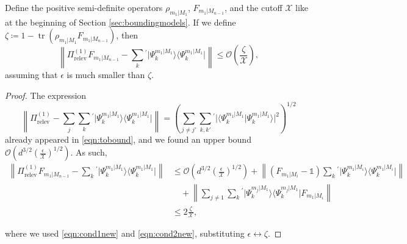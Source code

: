 \begin{lemma}
\label{lem:approxproj}
Define the positive semi-definite operators $\rho_{m_1\vert M_1}$, $F_{m_1\vert M_{n-1}}$, and the cutoff $\mathcal{X}$ like at the beginning of Section \ref{sec:boundingmodels}. If we define $ \zeta\coloneqq 1- \operatorname{tr}(\rho_{m_1\vert M_1}F_{m_1 \vert M_{n-1}})$, then \[\left\|\Pi_{\text{relev}}^{(1)}F_{m_1\vert M_{n-1}}-\sum_k{}^{'}\vert \Psi_k^{m_1\vert M_1} \rangle \langle \Psi_k^{m_1\vert M_1} \vert \right\|\leq \mathcal{O}\left(\frac{\zeta}{\mathcal{X}}\right),\]
assuming that $\epsilon$ is much smaller than $\zeta$.
\end{lemma}
\begin{proof}
The expression \[\left\| \Pi_{\text{relev}}^{(1)}-\sum_j \sum_k{}^{'}\vert \Psi_k^{m_1\vert M_1}\rangle \langle \Psi_k^{m_1\vert M_1} \vert \right\| =  \left(\sum_{j\neq j'}\sum_{k,k'}{}^{'}\vert \langle \Psi_k^{m_1\vert M_1} \vert  \Psi_k^{m_1\vert M_1} \rangle \vert ^2 \right)^{1/2}\] already appeared in \ref{eqn:tobound}, and we found an upper bound $\mathcal{O}\left(d^{3/2}\left(\frac{\epsilon}{\mathcal{X}}\right)^{1/2}\right)$. As such,
\[\begin{split}
\left\|\Pi_{\text{relev}}^{(1)}F_{m_1\vert M_{n-1}}-\sum_k{}^{'}\vert \Psi_k^{m_1\vert M_1} \rangle \langle \Psi_k^{m_1\vert M_1} \vert \right\| & \leq \mathcal{O}\left(d^{3/2}\left(\frac{\epsilon}{\mathcal{X}}\right)^{1/2}\right) + \left\| \left(F_{m_1\vert M_i}-\mathbb{1}\right)\sum_k{}^{'}\vert \Psi_k^{m_1\vert M_i}\rangle \langle \Psi_k^{m_1\vert M_i} \vert \right\| \\[0.5em]
&\hspace{1em} +\left\|\sum_{j\neq 1}\sum_k{}^{'}\vert \Psi_k^{m_j\vert M_1} \rangle \langle \Psi_k^{m_j\vert M_1} \vert F_{m_1\vert M_i}\right\| \\[0.8em]
& \leq 2 \frac{\zeta}{\mathcal{X}},
\end{split}\]

where we used \ref{eqn:cond1new} and \ref{eqn:cond2new}, substituting $\epsilon\leftrightarrow \zeta$.

\end{proof}

